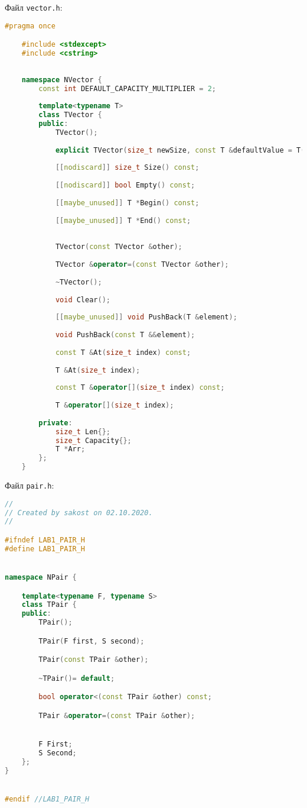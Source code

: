 Файл \texttt{vector.h}:
\begin{lstlisting}[language=C++]
	#pragma once

	#include <stdexcept>
	#include <cstring>
	
	
	namespace NVector {
		const int DEFAULT_CAPACITY_MULTIPLIER = 2;
	
		template<typename T>
		class TVector {
		public:
			TVector();
	
			explicit TVector(size_t newSize, const T &defaultValue = T());
	
			[[nodiscard]] size_t Size() const;
	
			[[nodiscard]] bool Empty() const;
	
			[[maybe_unused]] T *Begin() const;
	
			[[maybe_unused]] T *End() const;
	
	
			TVector(const TVector &other);
	
			TVector &operator=(const TVector &other);
	
			~TVector();
	
			void Clear();
	
			[[maybe_unused]] void PushBack(T &element);
	
			void PushBack(const T &&element);
	
			const T &At(size_t index) const;
	
			T &At(size_t index);
	
			const T &operator[](size_t index) const;
	
			T &operator[](size_t index);
	
		private:
			size_t Len{};
			size_t Capacity{};
			T *Arr;
		};
	}
\end{lstlisting}
Файл \texttt{pair.h}:
\begin{lstlisting}[language=C++]
//
// Created by sakost on 02.10.2020.
//

#ifndef LAB1_PAIR_H
#define LAB1_PAIR_H


namespace NPair {

    template<typename F, typename S>
    class TPair {
    public:
        TPair();

        TPair(F first, S second);

        TPair(const TPair &other);

        ~TPair()= default;

        bool operator<(const TPair &other) const;

        TPair &operator=(const TPair &other);


        F First;
        S Second;
    };
}


#endif //LAB1_PAIR_H
\end{lstlisting}


